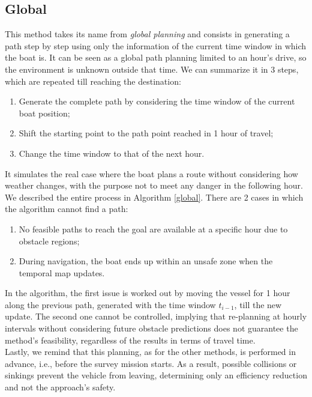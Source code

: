 \subsection{Global}
This method takes its name from \textit{global planning} and consists in generating a path step by step using only the information of the current time window in which the boat is. It can be seen as a global path planning limited to an hour's drive, so the environment is unknown outside that time. We can summarize it in 3 steps, which are repeated till reaching the destination:
\begin{enumerate}[itemsep=0pt]
	\item Generate the complete path by considering the time window of the current boat position;
	\item Shift the starting point to the path point reached in 1 hour of travel;
	\item Change the time window to that of the next hour.
\end{enumerate}
It simulates the real case where the boat plans a route without considering how weather changes, with the purpose not to meet any danger in the following hour. We described the entire process in Algorithm \ref{global}.
There are 2 cases in which the algorithm cannot find a path:
\begin{enumerate}[itemsep=0pt]
	\item  No feasible paths to reach the goal are available at a specific hour due to obstacle regions;
	\item During navigation, the boat ends up within an unsafe zone when the temporal map updates.
\end{enumerate}
In the algorithm, the first issue is worked out by moving the vessel for 1 hour along the previous path, generated with the time window $t_{i-1}$, till the new update. The second one cannot be controlled, implying that re-planning at hourly intervals without considering future obstacle predictions does not guarantee the method's feasibility, regardless of the results in terms of travel time.\\
Lastly, we remind that this planning, as for the other methods, is performed in advance, i.e., before the survey mission starts. As a result, possible collisions or sinkings prevent the vehicle from leaving, determining only an efficiency reduction and not the approach's safety.
\newpage

